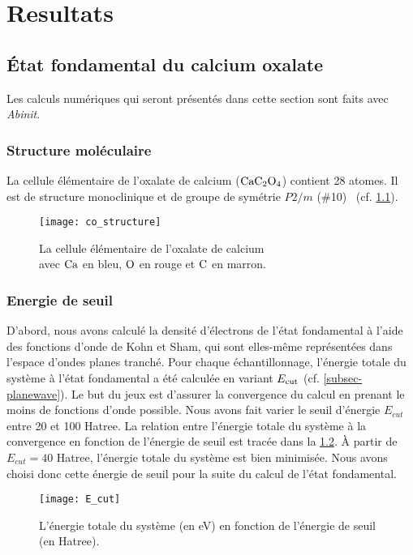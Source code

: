 \chapter{Resultats}
\label{chap-results}

\section{État fondamental du calcium oxalate}
Les calculs numériques qui seront présentés dans cette section sont faits avec \textit{Abinit}.

\subsection{Structure moléculaire}
La cellule élémentaire de l'oxalate de calcium ($\textnormal{Ca} \textnormal{C}_2 \textnormal{O}_4$) contient 28 atomes.
Il est de structure monoclinique et de groupe de symétrie $P2/m$ ($\#$10)~\cite{Kolezynski2010} (cf. \cref{BrillouinZone}).

\begin{figure}[!h]
  \centering
  \captionsetup{width=0.8\textwidth}
  \texttt{[image: co\_structure]}
  \caption{La cellule élémentaire de l'oxalate de calcium\\ avec $\textnormal{Ca}$ en bleu, $\textnormal{O}$ en rouge et $\textnormal{C}$ en marron.}\label{BrillouinZone}
\end{figure}

\subsection{Energie de seuil}
D'abord, nous avons calculé la densité d'électrons de l'état fondamental
à l'aide des fonctions d'onde de Kohn et Sham,
qui sont elles-même représentées dans l'espace d'ondes planes tranché.
Pour chaque échantillonnage, l'énergie totale du système à l'état fondamental a été calculée
en variant $E_{\textnormal{cut}}$ (cf. \cref{subsec-planewave}).
Le but du jeux est d'assurer la convergence du calcul en prenant le moins de fonctions d'onde possible.
Nous avons fait varier le seuil d'énergie $E_{cut}$ entre 20 et 100 Hatree.
La relation entre l'énergie totale du système à la convergence
en fonction de l'énergie de seuil est tracée dans la \cref{fig-Ecut}.
À partir de $E_{cut} = 40$ Hatree, l'énergie totale du système est bien minimisée.
Nous avons choisi donc cette énergie de seuil pour la suite du calcul de l'état fondamental.

\begin{figure}[!h]
    \centering
    \texttt{[image: E\_cut]}
    \caption{L'énergie totale du système (en eV) en fonction de l'énergie de seuil (en Hatree).}\label{fig-Ecut}
\end{figure}

